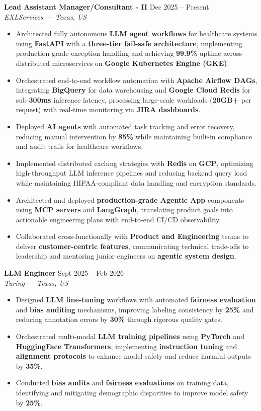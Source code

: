 \documentclass[11pt,a4paper]{article}
\newcommand{\jobentry}[3]{%
  \vspace{5pt}%
  \noindent\textbf{#1} \hfill #3\\%
  \textit{#2}%
}
\begin{document}
\jobentry{Lead Assistant Manager/Consultant - II}{EXLServices — Texas, US}{Dec 2025 -- Present}
\begin{itemize}
\item Architected fully autonomous \textbf{LLM agent workflows} for healthcare systems using \textbf{FastAPI} with a \textbf{three-tier fail-safe architecture}, implementing production-grade exception handling and achieving \textbf{99.9\%} uptime across distributed microservices on \textbf{Google Kubernetes Engine (GKE)}.
\item Orchestrated end-to-end workflow automation with \textbf{Apache Airflow DAGs}, integrating \textbf{BigQuery} for data warehousing and \textbf{Google Cloud Redis} for sub-\textbf{300ms} inference latency, processing large-scale workloads (\textbf{20GB+} per request) with real-time monitoring via \textbf{JIRA dashboards}.
\item Deployed \textbf{AI agents} with automated task tracking and error recovery, reducing manual intervention by \textbf{85\%} while maintaining built-in compliance and audit trails for healthcare workflows.
\item Implemented distributed caching strategies with \textbf{Redis} on \textbf{GCP}, optimizing high-throughput LLM inference pipelines and reducing backend query load while maintaining HIPAA-compliant data handling and encryption standards.
\item Architected and deployed \textbf{production-grade Agentic App} components using \textbf{MCP servers} and \textbf{LangGraph}, translating product goals into actionable engineering plans with end-to-end CI/CD observability.
\item Collaborated cross-functionally with \textbf{Product and Engineering} teams to deliver \textbf{customer-centric features}, communicating technical trade-offs to leadership and mentoring junior engineers on \textbf{agentic system design}.
\end{itemize}

\jobentry{LLM Engineer}{Turing — Texas, US}{Sept 2025 -- Feb 2026}
\begin{itemize}
\item Designed \textbf{LLM fine-tuning} workflows with automated \textbf{fairness evaluation} and \textbf{bias auditing} mechanisms, improving labeling consistency by \textbf{25\%} and reducing annotation errors by \textbf{30\%} through rigorous quality gates.
\item Orchestrated multi-modal \textbf{LLM training pipelines} using \textbf{PyTorch} and \textbf{HuggingFace Transformers}, implementing \textbf{instruction tuning} and \textbf{alignment protocols} to enhance model safety and reduce harmful outputs by \textbf{35\%}.
\item Conducted \textbf{bias audits} and \textbf{fairness evaluations} on training data, identifying and mitigating demographic disparities to improve model safety by \textbf{25\%}.
\end{itemize}
\end{document}
